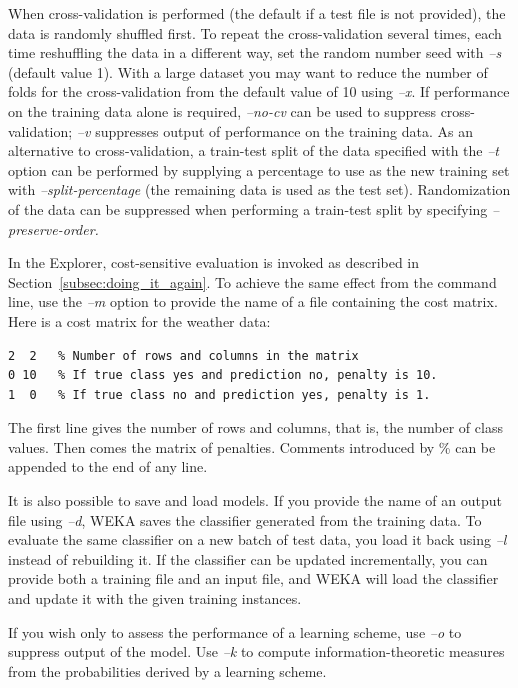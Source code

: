 When cross-validation is performed (the default if a test file is not
provided), the data is randomly shuffled first. To repeat the
cross-validation several times, each time reshuffling the data in a
different way, set the random number seed with \textit{--s} (default
value 1). With a large dataset you may want to reduce the number of
folds for the cross-validation from the default value of 10
using \textit{--x}. If performance on the training data alone is
required, \textit{--no-cv} can be used to suppress
cross-validation; \textit{--v} suppresses output of performance on the
training data. As an alternative to cross-validation, a train-test
split of the data specified with the \textit{--t} option can be
performed by supplying a percentage to use as the new training set
with \textit{--split-percentage} (the remaining data is used as the test
set). Randomization of the data can be suppressed when performing a
train-test split by specifying \textit{--preserve-order.}

In the Explorer, cost-sensitive evaluation is invoked as described in
Section~\ref{subsec:doing_it_again}. To achieve the same effect from
the command line, use the \textit{--m} option to provide the name of a
file containing the cost matrix. Here is a cost matrix for the weather
data: \newline

\begin{Verbatim}[fontsize=\footnotesize]
2  2   % Number of rows and columns in the matrix
0 10   % If true class yes and prediction no, penalty is 10.
1  0   % If true class no and prediction yes, penalty is 1.
\end{Verbatim}

\noindent The first line gives the number of rows and columns, that is, 
the number of class values. Then comes the matrix of
penalties. Comments introduced by \% can be appended to the end of any
line.

It is also possible to save and load models. If you provide the name
of an output file using \textit{--d}, WEKA saves the classifier
generated from the training data. To evaluate the same classifier on a
new batch of test data, you load it back using \textit{--l} instead of
rebuilding it. If the classifier can be updated incrementally, you can
provide both a training file and an input file, and WEKA will load the
classifier and update it with the given training instances.

If you wish only to assess the performance of a learning scheme, use
\textit{--o} to suppress output of the model. Use \textit{--k} to compute
information-theoretic measures from the probabilities derived by a
learning scheme.

